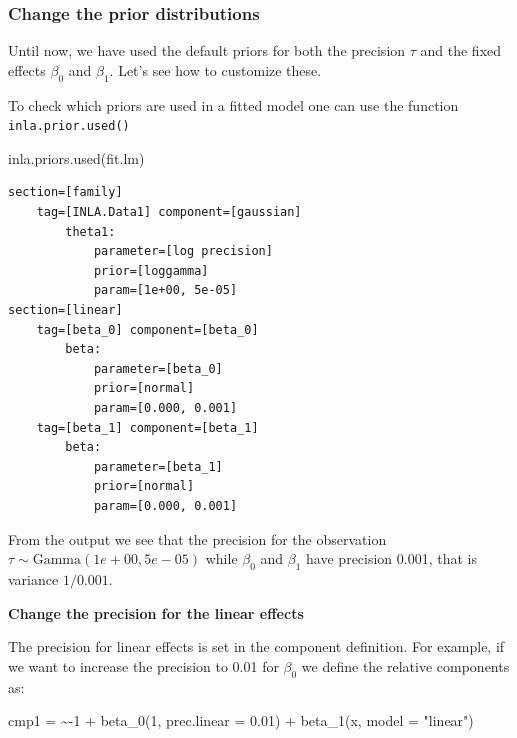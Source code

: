 \documentclass[
  letterpaper,
  DIV=11,
  numbers=noendperiod]{scrartcl}
\newenvironment{Shaded}{\begin{snugshade}}{\end{snugshade}}
\newcommand{\AttributeTok}[1]{\textcolor[rgb]{0.40,0.45,0.13}{#1}}
\newcommand{\DecValTok}[1]{\textcolor[rgb]{0.68,0.00,0.00}{#1}}
\newcommand{\ErrorTok}[1]{\textcolor[rgb]{0.68,0.00,0.00}{#1}}
\newcommand{\FloatTok}[1]{\textcolor[rgb]{0.68,0.00,0.00}{#1}}
\newcommand{\FunctionTok}[1]{\textcolor[rgb]{0.28,0.35,0.67}{#1}}
\newcommand{\NormalTok}[1]{\textcolor[rgb]{0.00,0.23,0.31}{#1}}
\newcommand{\OtherTok}[1]{\textcolor[rgb]{0.00,0.23,0.31}{#1}}
\newcommand{\SpecialCharTok}[1]{\textcolor[rgb]{0.37,0.37,0.37}{#1}}
\newcommand{\StringTok}[1]{\textcolor[rgb]{0.13,0.47,0.30}{#1}}
\begin{document}
\subsubsection{Change the prior
distributions}\label{change-the-prior-distributions}

Until now, we have used the default priors for both the precision
\(\tau\) and the fixed effects \(\beta_0\) and \(\beta_1\). Let's see
how to customize these.

To check which priors are used in a fitted model one can use the
function \texttt{inla.prior.used()}

\begin{Shaded}
\begin{Highlighting}[]
\FunctionTok{inla.priors.used}\NormalTok{(fit.lm)}
\end{Highlighting}
\end{Shaded}

\begin{verbatim}
section=[family]
    tag=[INLA.Data1] component=[gaussian]
        theta1:
            parameter=[log precision]
            prior=[loggamma]
            param=[1e+00, 5e-05]
section=[linear]
    tag=[beta_0] component=[beta_0]
        beta:
            parameter=[beta_0]
            prior=[normal]
            param=[0.000, 0.001]
    tag=[beta_1] component=[beta_1]
        beta:
            parameter=[beta_1]
            prior=[normal]
            param=[0.000, 0.001]
\end{verbatim}

From the output we see that the precision for the observation
\(\tau\sim\text{Gamma}(1e+00,5e-05)\) while \(\beta_0\) and \(\beta_1\)
have precision 0.001, that is variance \(1/0.001\).

\textbf{Change the precision for the linear effects}

The precision for linear effects is set in the component definition. For
example, if we want to increase the precision to 0.01 for \(\beta_0\) we
define the relative components as:

\begin{Shaded}
\begin{Highlighting}[]
\NormalTok{cmp1 }\OtherTok{=}  \ErrorTok{\textasciitilde{}}\SpecialCharTok{{-}}\DecValTok{1} \SpecialCharTok{+}  \FunctionTok{beta\_0}\NormalTok{(}\DecValTok{1}\NormalTok{, }\AttributeTok{prec.linear =} \FloatTok{0.01}\NormalTok{) }\SpecialCharTok{+} \FunctionTok{beta\_1}\NormalTok{(x, }\AttributeTok{model =} \StringTok{"linear"}\NormalTok{)}
\end{Highlighting}
\end{Shaded}
\end{document}
